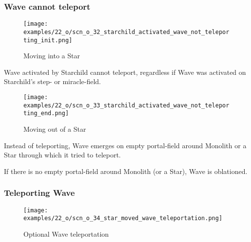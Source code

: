 \clearpage %

\subsubsection*{Wave cannot teleport}
\label{sec:One/Starchild/Activating Wave/Wave cannot teleport}

\vspace*{-0.1\baselineskip}
\noindent
\begin{wrapfigure}[4]{l}{0.4\textwidth}
\centering
\texttt{[image: examples/22\_o/scn\_o\_32\_starchild\_activated\_wave\_not\_teleporting\_init.png]}
\vspace*{-0.4\baselineskip}
\caption{Moving into a Star}
\label{fig:scn_o_32_starchild_activated_wave_not_teleporting_init}
\end{wrapfigure}
Wave activated by Starchild cannot teleport, regardless if Wave was activated on
Starchild's step- or miracle-field.

\vspace*{5.7\baselineskip}
\noindent
\begin{wrapfigure}[7]{l}{0.4\textwidth}
\centering
\texttt{[image: examples/22\_o/scn\_o\_33\_starchild\_activated\_wave\_not\_teleporting\_end.png]}
\vspace*{-0.4\baselineskip}
\caption{Moving out of a Star}
\label{fig:scn_o_33_starchild_activated_wave_not_teleporting_end}
\end{wrapfigure}
Instead of teleporting, Wave emerges on empty portal-field around Monolith or a
Star through which it tried to teleport.

If there is no empty portal-field around Monolith (or a Star), Wave is oblationed.

\clearpage %

\subsubsection*{Teleporting Wave}
\label{sec:One/Starchild/Activating Wave/Teleporting Wave}

\vspace*{-1.5\baselineskip}
\noindent
\begin{figure}[!h]
\texttt{[image: examples/22\_o/scn\_o\_34\_star\_moved\_wave\_teleportation.png]}
\vspace*{-1.4\baselineskip}
\caption{Optional Wave teleportation}
\label{fig:scn_o_34_star_moved_wave_teleportation}
\end{figure}

